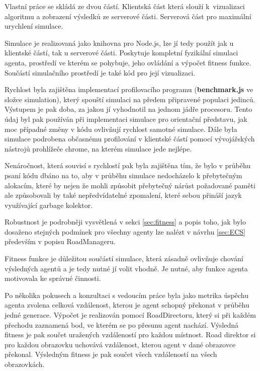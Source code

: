 



Vlastní práce se skládá ze dvou částí. Klientská část která slouží k~vizualizaci algoritmu a zobrazení výsledků ze serverové části. Serverová část pro maximální urychlení simulace. 

Simulace je realizovaná jako knihovna pro Node.js, lze jí tedy použít jak u klientské částí, tak u serverové části. Poskytuje kompletní fyzikální simulaci agenta, prostředí ve kterém se pohybuje, jeho ovládání a výpočet fitness funkce. Součástí simulačního prostředí je také kód pro její vizualizaci.

Rychlost byla zajištěna implementací profilovacího programu (\textbf{benchmark.js} ve složce simulation), který spouští simulaci na předem připravené populaci jedinců. Výstupem je pak doba, za jakou jí vyhodnotil na jednom jádře procesoru. Tento údaj byl pak používán při implementaci simulace pro orientační představu, jak moc případné změny v kódu ovlivňují rychlost samotné simulace. Dále byla simulace podrobena občasnému profilování v klientské částí pomocí vývojářských nástrojů prohlížeče chrome, na kterém simulace jede nejlépe.

Nenáročnost, která souvisí s rychlostí pak byla zajištěna tím, že bylo v průběhu psaní kódu dbáno na to, aby v průběhu simulace nedocházelo k přebytečným alokacím, které by nejen že mohli způsobit přebytečný nárůst požadované paměti ale způsobovali by také nepředvídatelné zpomalení, které sebou přináší jazyk využívající garbage kolektor.

Robustnost je podrobněji vysvětlená v sekci \ref{sec:fitness} a popis toho, jak bylo dosaženo stejných podmínek pro všechny agenty lze nalézt v návrhu \ref{sec:ECS} především v popisu RoadManageru.

\label{sec:fitness}
Fitness funkce je důležitou součástí simulace, která zásadně ovlivňuje chování výsledných agentů a je tedy nutné jí volit vhodně. Je nutné, aby funkce agenta motivovala ke správné činnosti.

Po několika pokusech a konzultaci s vedoucím práce byla jako metrika úspěchu agenta zvolena celková vzdálenost, kterou je agent schopný překonat v průběhu jedné generace. Výpočet je realizován pomocí RoadDirectoru, který si při každém přechodu zaznamená bod, ve kterém se po přesunu agent nachází. Výsledná fitness je pak součet uražených vzdáleností pro každou místnost. Road direktor si pro každou obrazovku uchovává vzdálenost, kterou agent v dané obrazovce překonal. Výsledným fitness je pak součet všech vzdáleností na všech obrazovkách.

